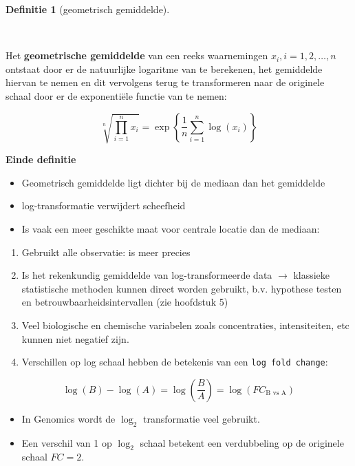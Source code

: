 \documentclass[
  dutch,
  letterpaper,
  12pt]{book}
\providecommand{\tightlist}{%
  \setlength{\itemsep}{0pt}\setlength{\parskip}{0pt}}
\theoremstyle{definition}
\theoremstyle{definition}
\newtheorem{definition}{Definitie}[chapter]
\theoremstyle{definition}
\theoremstyle{remark}
\begin{document}
\begin{definition}[geometrisch
gemiddelde]\protect\hypertarget{def-geometrisch-gemiddelde}{}\label{def-geometrisch-gemiddelde}

~

\end{definition}

Het \textbf{geometrische gemiddelde} van een reeks waarnemingen
\(x_i, i=1,
2, \dots, n\) ontstaat door er de natuurlijke logaritme van te
berekenen, het gemiddelde hiervan te nemen en dit vervolgens terug te
transformeren naar de originele schaal door er de exponentiële functie
van te nemen:

\begin{equation*}
\sqrt[n]{\prod\limits_{i=1}^n x_i} = \exp\left\{\frac{1}{n} \sum_{i=1}^n \log(x_i)\right\}
\end{equation*}

\textbf{Einde definitie}

\begin{itemize}
\item
  Geometrisch gemiddelde ligt dichter bij de mediaan dan het gemiddelde
\item
  log-transformatie verwijdert scheefheid
\item
  Is vaak een meer geschikte maat voor centrale locatie dan de mediaan:
\end{itemize}

\begin{enumerate}
\def\labelenumi{\arabic{enumi}.}
\tightlist
\item
  Gebruikt alle observatie: is meer precies
\item
  Is het rekenkundig gemiddelde van log-transformeerde data
  \(\rightarrow\) klassieke statistische methoden kunnen direct worden
  gebruikt, b.v. hypothese testen en betrouwbaarheidsintervallen (zie
  hoofdstuk 5)
\item
  Veel biologische en chemische variabelen zoals concentraties,
  intensiteiten, etc kunnen niet negatief zijn.
\item
  Verschillen op log schaal hebben de betekenis van een
  \texttt{log\ fold\ change}:
\end{enumerate}

\[
\log (B) - \log(A)= \log(\frac{B}{A})=\log(FC_\text{B vs A})
\]

\begin{itemize}
\item
  In Genomics wordt de \(\log_2\) transformatie veel gebruikt.
\item
  Een verschil van 1 op \(\log_2\) schaal betekent een verdubbeling op
  de originele schaal \(FC=2\).
\end{itemize}
\end{document}
